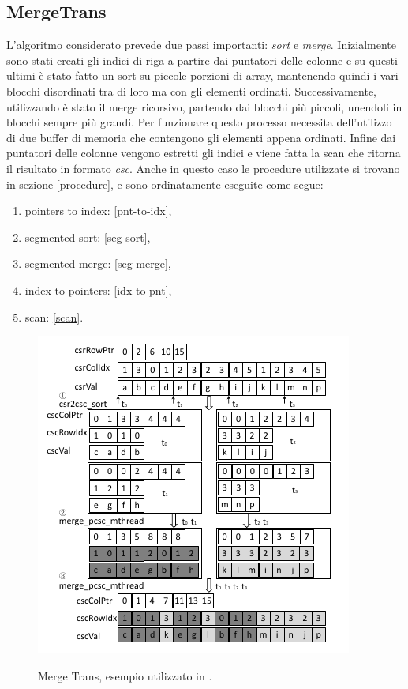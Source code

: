 \documentclass[]{IEEEtran}
\begin{document}
	\subsection{MergeTrans}
	L'algoritmo considerato prevede due passi importanti: \textit{sort} e \textit{merge}.
	Inizialmente sono stati creati gli indici di riga a partire dai puntatori delle colonne e su questi ultimi è stato fatto un sort su piccole porzioni di array, mantenendo quindi i vari blocchi disordinati tra di loro ma con gli elementi ordinati. Successivamente, utilizzando è stato il merge ricorsivo, partendo dai blocchi più piccoli, unendoli in blocchi sempre più grandi. Per funzionare questo processo necessita dell'utilizzo di due buffer di memoria che contengono gli elementi appena ordinati. Infine dai puntatori delle colonne vengono estretti gli indici e viene fatta la scan che ritorna il risultato in formato \textit{csc}. \newline
	Anche in questo caso le procedure utilizzate si trovano in sezione \ref{procedure}, e sono ordinatamente eseguite come segue:
	\begin{enumerate}
		\item pointers to index: \ref{pnt-to-idx},
		\item segmented sort: \ref{seg-sort},
		\item segmented merge: \ref{seg-merge},
		\item index to pointers: \ref{idx-to-pnt},
		\item scan: \ref{scan}.
	\end{enumerate}
	
	\begin{figure}[H]
		\includegraphics[scale=0.8]{mergetrans.png}
		\label{mergetrans}
		\caption{Merge Trans, esempio utilizzato in \cite{parallelTrans}.}
	\end{figure}
	
\end{document}

